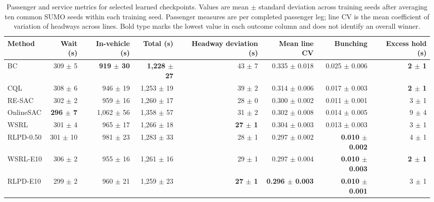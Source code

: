 \begin{table}[t]
\centering
\caption{Passenger and service metrics for selected learned checkpoints. Values are mean $\pm$ standard deviation across training seeds after averaging ten common SUMO seeds within each training seed. Passenger measures are per completed passenger leg; line CV is the mean coefficient of variation of headways across lines. Bold type marks the lowest value in each outcome column and does not identify an overall winner.}
\label{tab:operational-metrics}
\scriptsize
\renewcommand{\arraystretch}{1.00}
\setlength{\tabcolsep}{1.5pt}
\begin{tabular}{@{}lrrrrrrr@{}}
\toprule
Method & Wait (s) & In-vehicle (s) & Total (s) & Headway deviation (s) & Mean line CV & Bunching & Excess hold (s) \\
\midrule
BC & 309 $\pm$ 5 & \textbf{919 $\pm$ 30} & \textbf{1,228 $\pm$ 27} & 43 $\pm$ 7 & 0.335 $\pm$ 0.018 & 0.025 $\pm$ 0.006 & \textbf{2 $\pm$ 1} \\
CQL & 308 $\pm$ 6 & 946 $\pm$ 19 & 1,253 $\pm$ 19 & 39 $\pm$ 2 & 0.314 $\pm$ 0.006 & 0.017 $\pm$ 0.003 & \textbf{2 $\pm$ 1} \\
RE-SAC & 302 $\pm$ 2 & 959 $\pm$ 16 & 1,260 $\pm$ 17 & 28 $\pm$ 0 & 0.300 $\pm$ 0.002 & 0.011 $\pm$ 0.001 & 3 $\pm$ 1 \\
OnlineSAC & \textbf{296 $\pm$ 7} & 1,062 $\pm$ 56 & 1,358 $\pm$ 57 & 31 $\pm$ 2 & 0.302 $\pm$ 0.008 & 0.014 $\pm$ 0.005 & 9 $\pm$ 4 \\
WSRL & 301 $\pm$ 4 & 965 $\pm$ 17 & 1,266 $\pm$ 18 & \textbf{27 $\pm$ 1} & 0.304 $\pm$ 0.003 & 0.013 $\pm$ 0.003 & 3 $\pm$ 1 \\
RLPD-0.50 & 301 $\pm$ 10 & 981 $\pm$ 23 & 1,283 $\pm$ 33 & 28 $\pm$ 1 & 0.297 $\pm$ 0.002 & \textbf{0.010 $\pm$ 0.002} & 4 $\pm$ 1 \\
WSRL-E10 & 306 $\pm$ 2 & 955 $\pm$ 16 & 1,261 $\pm$ 16 & 29 $\pm$ 1 & 0.297 $\pm$ 0.004 & \textbf{0.010 $\pm$ 0.003} & \textbf{2 $\pm$ 1} \\
RLPD-E10 & 299 $\pm$ 2 & 960 $\pm$ 21 & 1,259 $\pm$ 23 & \textbf{27 $\pm$ 1} & \textbf{0.296 $\pm$ 0.003} & \textbf{0.010 $\pm$ 0.001} & 3 $\pm$ 1 \\
\bottomrule
\end{tabular}
\end{table}
